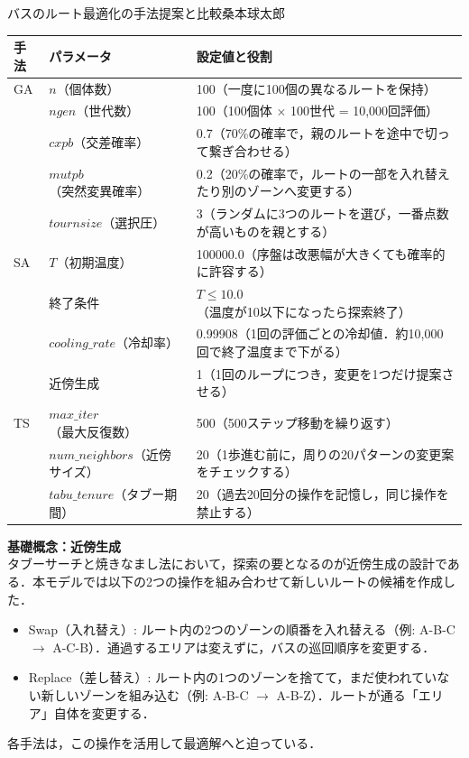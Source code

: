 \begin{column}{バスのルート最適化の手法提案と比較}{桑本球太郎}
\begin{center}
  \label{tab:hyperparameters}
  \begin{tabular}{llp{7.5cm}}
    \toprule
    手法 & パラメータ & 設定値と役割 \\
    \midrule
    GA & $n$（個体数） & 100（一度に100個の異なるルートを保持） \\
       & $ngen$（世代数） & 100（100個体 $\times$ 100世代 = 10,000回評価） \\
       & $cxpb$（交差確率） & 0.7（70\%の確率で，親のルートを途中で切って繋ぎ合わせる） \\
       & $mutpb$（突然変異確率） & 0.2（20\%の確率で，ルートの一部を入れ替えたり別のゾーンへ変更する） \\
       & $tournsize$（選択圧） & 3（ランダムに3つのルートを選び，一番点数が高いものを親とする） \\
    \midrule
    SA & $T$（初期温度） & 100000.0（序盤は改悪幅が大きくても確率的に許容する） \\
       & 終了条件 & $T \leq 10.0$（温度が10以下になったら探索終了） \\
       & $cooling\_rate$（冷却率） & 0.99908（1回の評価ごとの冷却値．約10,000回で終了温度まで下がる） \\
       & 近傍生成 & 1（1回のループにつき，変更を1つだけ提案させる） \\
    \midrule
    TS & $max\_iter$（最大反復数） & 500（500ステップ移動を繰り返す） \\
       & $num\_neighbors$（近傍サイズ） & 20（1歩進む前に，周りの20パターンの変更案をチェックする） \\
       & $tabu\_tenure$（タブー期間） & 20（過去20回分の操作を記憶し，同じ操作を禁止する） \\
    \bottomrule
  \end{tabular}
\end{center}

\textbf{基礎概念：近傍生成}\\
タブーサーチと焼きなまし法において，探索の要となるのが近傍生成の設計である．本モデルでは以下の2つの操作を組み合わせて新しいルートの候補を作成した．
\begin{itemize}
    \item Swap（入れ替え）: ルート内の2つのゾーンの順番を入れ替える（例: A-B-C $\to$ A-C-B）．通過するエリアは変えずに，バスの巡回順序を変更する．
    \item Replace（差し替え）: ルート内の1つのゾーンを捨てて，まだ使われていない新しいゾーンを組み込む（例: A-B-C $\to$ A-B-Z）．ルートが通る「エリア」自体を変更する．
\end{itemize}
各手法は，この操作を活用して最適解へと迫っている．


\end{column}
